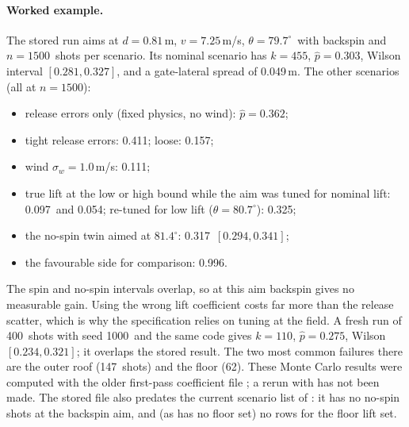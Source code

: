 \paragraph{Worked example.}
The stored run  aims at $d=0.81$\,\unit{m}\predicted,
$v=7.25$\,\unit{m/s}\predicted, $\theta=79.7^\circ$\predicted\ with backspin and $n=1500$\assumed\ shots
per scenario.
Its nominal scenario has $k=455$\predicted, $\hat p=0.303$\predicted, Wilson interval
$[0.281, 0.327]$\derived, and a gate-lateral spread of 0.049\,\unit{m}\predicted.
The other scenarios (all at $n=1500$\assumed):
\begin{itemize}
  \item release errors only (fixed physics, no wind): $\hat p=0.362$\predicted;
  \item tight release errors: 0.411\predicted; loose: 0.157\predicted;
  \item wind $\sigma_w=1.0$\,\unit{m/s}\assumed: 0.111\predicted;
  \item true lift at the low or high bound while the aim was tuned for nominal lift:
    0.097\predicted\ and 0.054\predicted; re-tuned for low lift ($\theta=80.7^\circ$\predicted):
    0.325\predicted;
  \item the no-spin twin aimed at $81.4^\circ$\predicted: 0.317\predicted\ $[0.294, 0.341]$\derived;
  \item the favourable side for comparison: 0.996\predicted.
\end{itemize}
The spin and no-spin intervals overlap, so at this aim backspin gives no measurable gain.
Using the wrong lift coefficient costs far more than the release scatter, which is why the
specification relies on tuning at the field.
A fresh run of 400\assumed\ shots with seed 1000\assumed\ and the same code gives
$k=110$\predicted, $\hat p=0.275$\predicted, Wilson $[0.234, 0.321]$\derived; it overlaps the stored
result.
The two most common failures there are the outer roof (147\predicted\ shots) and the floor
(62\predicted).
These Monte Carlo results were computed with the older first-pass coefficient file
; a rerun with  has not been made.
The stored file also predates the current scenario list of : it has no no-spin
shots at the backspin aim, and (as  has no floor set) no rows for the
floor lift set.

